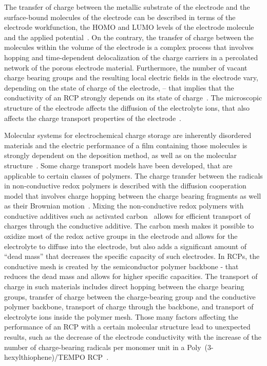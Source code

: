 \par
The transfer of charge between the metallic substrate of the electrode and the surface-bound molecules of the electrode can be described in terms of the electrode workfunction, the HOMO and LUMO levels of the electrode molecule and the applied potential~\cite{Bard_book}. 
On the contrary, the transfer of charge between the molecules within the volume of the electrode is a complex process that involves hopping and time-dependent delocalization of the charge carriers in a percolated network of the porous electrode material. Furthermore, the number of vacant charge bearing groups and the resulting local electric fields in the electrode vary, depending on the state of charge of the electrode, -- that implies that the conductivity of an RCP strongly depends on its state of charge~\cite{Zhang2018}.
The microscopic structure of the electrode affects the diffusion of the electrolyte ions, that also affects the charge transport properties of the electrode~\cite{Koshika_2009,He_2022}.\\ 

\par
Molecular systems for electrochemical charge storage are inherently disordered materials and the electric performance of a film containing those molecules is strongly dependent on the deposition method, as well as on the molecular structure~\cite{Xie2021,Zhang2018}. Some charge transport models have been developed, that are applicable to certain classes of polymers. The charge transfer between the radicals in non-conductive redox polymers is described with the diffusion cooperation model that involves charge hopping between the charge bearing fragments as well as their Brownian motion~\cite{Sato2018}. Mixing the non-conductive redox polymers with conductive additives such as activated carbon~\cite{Vereshchagin2022,Daniel2023_Multimodal} allows for efficient transport of charges through the conductive additive. The carbon mesh makes it possible to oxidize most of the redox active groups in the electrode and allows for the electrolyte to diffuse into the electrode, but also adds a significant amount of ``dead mass'' that decreases the specific capacity of such electrodes. In RCPs, the conductive  mesh is created by the semiconductor polymer backbone - that reduces the dead mass and allows for higher specific capacities. The transport of charge in such materials includes direct hopping between the charge bearing groups, transfer of charge between the charge-bearing group and the conductive polymer backbone, transport of charge through the backbone, and transport of electrolyte ions inside the polymer mesh. Those many factors affecting the performance of an RCP with a certain molecular structure lead to unexpected results, such as the decrease of the electrode conductivity with the increase of the number of charge-bearing radicals per monomer unit in a Poly~(3-hexylthiophene)/TEMPO RCP~\cite{Zhang2018}.



